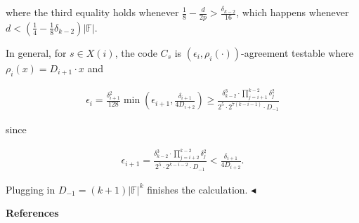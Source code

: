 \documentclass[10pt,a4paper]{article}
\begin{document}
where the third equality holds whenever $\frac{1}{8}-\frac{d}{2p}>\frac{\delta_{k-2}}{16}$, which happens whenever $d<\left(\frac{1}{4}-\frac{1}{8}\delta_{k-2}\right)|\mathbb{F}|$.\par




In general, for $s\in X(i)$, the code $C_{s}$ is $(\epsilon_{i},\rho_{i}(\cdot))$-agreement testable where $\rho_{i}(x)=D_{i+1}\cdot x$ and\par


\[\begin{gathered}
\displaystyle\epsilon_{i} \displaystyle=\frac{\delta_{i+1}^{2}}{128}\min\left(\epsilon_{i+1},\frac{\delta_{i+1}}{4D_{i+2}}\right)\geq\frac{\delta_{k-2}^{3}\cdot\prod_{j=i+1}^{k-2}\delta_{j}^{2}}{2^{5}\cdot 2^{7(k-i-1)}\cdot D_{-1}}
\end{gathered}\]


since\par


\[\begin{gathered}
\epsilon_{i+1}=\frac{\delta_{k-2}^{3}\cdot\prod_{j=i+2}^{k-2}\delta_{j}^{2}}{2^{5}\cdot 2^{k-i-2}\cdot D_{-1}}<\frac{\delta_{i+1}}{4D_{i+2}}.
\end{gathered}\]




Plugging in $D_{-1}=(k+1)|\mathbb{F}|^{k}$ finishes the calculation.
$\blacktriangleleft$\par






\par\medskip\noindent\textbf{References}\par
\end{document}
